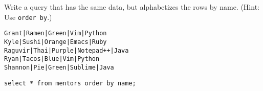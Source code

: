 \begin{blocksection}
\question Write a query that has the same data, but alphabetizes the rows by name. (Hint: Use \lstinline$order by$.)

\begin{lstlisting}
Grant|Ramen|Green|Vim|Python
Kyle|Sushi|Orange|Emacs|Ruby
Raguvir|Thai|Purple|Notepad++|Java
Ryan|Tacos|Blue|Vim|Python
Shannon|Pie|Green|Sublime|Java
\end{lstlisting}

\begin{solution}[1in]
\begin{lstlisting}
select * from mentors order by name;
\end{lstlisting}
\end{solution}
\end{blocksection}
